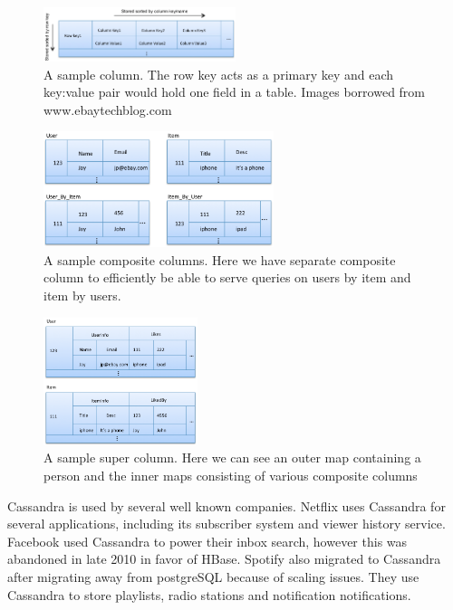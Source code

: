 \begin{figure}[h]
    \centering
    \includegraphics[width=0.5\textwidth]{resources/cas_col.png}
    \caption{A sample column. The row key acts as a primary key and each key:value pair would hold one field in a table. Images borrowed from www.ebaytechblog.com}
    \label{fig:sample_col}
\end{figure}

\begin{figure}[h]
    \centering
    \includegraphics[width=0.6\textwidth]{resources/cas_comp_col.png}
    \caption{A sample composite columns. Here we have separate composite column to efficiently be able to serve queries on users by item and item by users.}
    \label{fig:sample_comp_col}
\end{figure}

\begin{figure}[ht]
	\centering
	\includegraphics[width=0.4\textwidth]{resources/cas_super_col.png}
	\caption{A sample super column. Here we can see an outer map containing a person and the inner maps consisting of various composite columns}
	\label{fig:sample_super_col}
\end{figure}

Cassandra is used by several well known companies. Netflix uses Cassandra for several applications, including its subscriber system and viewer history service. Facebook used Cassandra to power their inbox search, however this was abandoned in late 2010 in favor of HBase. Spotify also migrated to Cassandra after migrating away from postgreSQL because of scaling issues. They use Cassandra to store playlists, radio stations and notification notifications.

